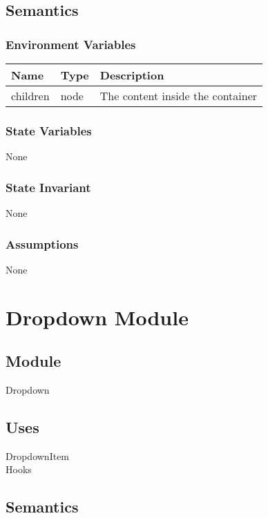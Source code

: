 \documentclass[12pt]{article}
\begin{document}
\subsection{Semantics}

\subsubsection{Environment Variables}
\begin{tabular}{| l | l | p{10cm} |}
    \hline
    \textbf{Name} & \textbf{Type} & \textbf{Description}\\ \hline
    children & node & The content inside the container\\ \hline
\end{tabular}

\subsubsection{State Variables}
None

\subsubsection{State Invariant}
None

\subsubsection{Assumptions}
None

\newpage

\section{Dropdown Module}

\subsection{Module}
Dropdown

\subsection{Uses}
DropdownItem \\
Hooks

\subsection{Semantics}
\end{document}
